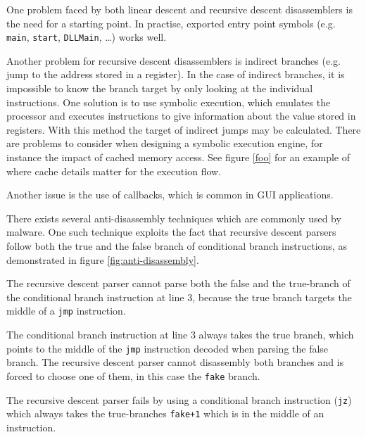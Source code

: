 One problem faced by both linear descent and recursive descent disassemblers is the need for a starting point. In practise, exported entry point symbols (e.g. \texttt{main}, \texttt{start}, \texttt{DLLMain}, …) works well.


Another problem for recursive descent disassemblers is indirect branches (e.g. jump to the address stored in a register). In the case of indirect branches, it is impossible to know the branch target by only looking at the individual instructions. One solution is to use symbolic execution, which emulates the processor and executes instructions to give information about the value stored in registers. With this method the target of indirect jumps may be calculated. There are problems to consider when designing a symbolic execution engine, for instance the impact of cached memory access. See figure \ref{foo} for an example of where cache details matter for the execution flow.


Another issue is the use of callbacks, which is common in GUI applications.

There exists several anti-disassembly techniques which are commonly used by malware. One such technique exploits the fact that recursive descent parsers follow both the true and the false branch of conditional branch instructions, as demonstrated in figure \ref{fig:anti-disassembly}.

The recursive descent parser cannot parse both the false and the true-branch of the conditional branch instruction at line 3, because the true branch targets the middle of a \texttt{jmp} instruction.

The conditional branch instruction at line 3 always takes the true branch, which points to the middle of the \texttt{jmp} instruction decoded when parsing the false branch. The recursive descent parser cannot disassembly both branches and is forced to choose one of them, in this case the \texttt{fake} branch.

The recursive descent parser fails by using a conditional branch instruction (\texttt{jz}) which always takes the true-branches \texttt{fake+1} which is in the middle of an instruction.

